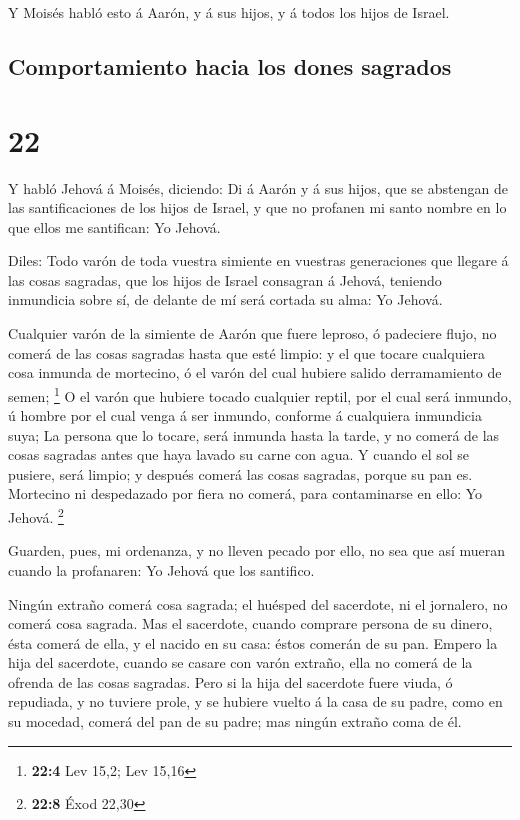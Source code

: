  Y Moisés habló esto á Aarón, y á sus hijos, y á todos los
hijos de Israel.

\hypertarget{comportamiento-hacia-los-dones-sagrados}{%
\subsection{Comportamiento hacia los dones
sagrados}\label{comportamiento-hacia-los-dones-sagrados}}

\hypertarget{section-21}{%
\section{22}\label{section-21}}

 Y habló Jehová á Moisés, diciendo:  Di á Aarón
y á sus hijos, que se abstengan de las santificaciones de los hijos de
Israel, y que no profanen mi santo nombre en lo que ellos me santifican:
Yo Jehová.

 Diles: Todo varón de toda vuestra simiente en vuestras
generaciones que llegare á las cosas sagradas, que los hijos de Israel
consagran á Jehová, teniendo inmundicia sobre sí, de delante de mí será
cortada su alma: Yo Jehová.

 Cualquier varón de la simiente de Aarón que fuere leproso,
ó padeciere flujo, no comerá de las cosas sagradas hasta que esté
limpio: y el que tocare cualquiera cosa inmunda de mortecino, ó el varón
del cual hubiere salido derramamiento de semen; \footnote{\textbf{22:4}
  Lev 15,2; Lev 15,16}  O el varón que hubiere tocado
cualquier reptil, por el cual será inmundo, ú hombre por el cual venga á
ser inmundo, conforme á cualquiera inmundicia suya;  La
persona que lo tocare, será inmunda hasta la tarde, y no comerá de las
cosas sagradas antes que haya lavado su carne con agua.  Y
cuando el sol se pusiere, será limpio; y después comerá las cosas
sagradas, porque su pan es.  Mortecino ni despedazado por
fiera no comerá, para contaminarse en ello: Yo Jehová. \footnote{\textbf{22:8}
  Éxod 22,30}

 Guarden, pues, mi ordenanza, y no lleven pecado por ello,
no sea que así mueran cuando la profanaren: Yo Jehová que los santifico.

 Ningún extraño comerá cosa sagrada; el huésped del
sacerdote, ni el jornalero, no comerá cosa sagrada.  Mas el
sacerdote, cuando comprare persona de su dinero, ésta comerá de ella, y
el nacido en su casa: éstos comerán de su pan.  Empero la
hija del sacerdote, cuando se casare con varón extraño, ella no comerá
de la ofrenda de las cosas sagradas.  Pero si la hija del
sacerdote fuere viuda, ó repudiada, y no tuviere prole, y se hubiere
vuelto á la casa de su padre, como en su mocedad, comerá del pan de su
padre; mas ningún extraño coma de él.

